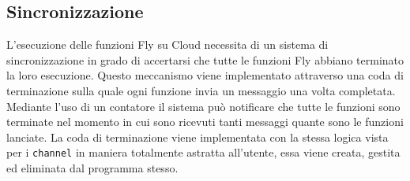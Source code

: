 \subsection{Sincronizzazione}
L'esecuzione delle funzioni Fly su Cloud necessita di un sistema di sincronizzazione in grado di accertarsi che tutte le funzioni Fly abbiano terminato la loro esecuzione. Questo meccanismo viene implementato attraverso una coda di terminazione sulla quale ogni funzione invia un messaggio una volta completata. Mediante l'uso di un contatore il sistema può notificare che tutte le funzioni sono terminate nel momento in cui sono ricevuti tanti messaggi quante sono le funzioni lanciate. La coda di terminazione viene implementata con la stessa logica vista per i \verb|channel| in maniera totalmente astratta all'utente, essa viene creata, gestita ed eliminata dal programma stesso.